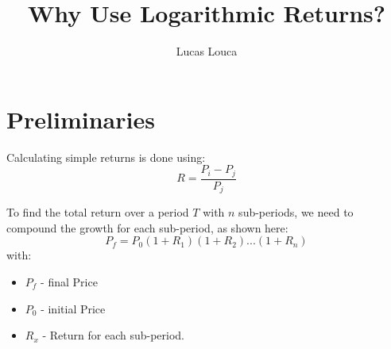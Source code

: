 \documentclass[11pt, oneside]{article}   	%
\title{Why Use Logarithmic Returns?}
\author{Lucas Louca}
\begin{document}
\maketitle

\section{Preliminaries}
Calculating simple returns is done using:
\begin{equation}
R=\frac{P_i - P_j}{P_j}
\end{equation}

To find the total return over a period $T$ with $n$ sub-periods, we need to compound the growth for each sub-period, as shown here:
\begin{equation}
	P_f = P_0(1+R_1)(1+R_2)...(1+R_n)
\end{equation}	
with: 
\begin{center}
	\begin{itemize}
		\item $P_f$ - final Price
		\item $P_0$ - initial Price
		\item $R_x$ - Return for each sub-period.
	\end{itemize}
\end{center}	
\end{document}
